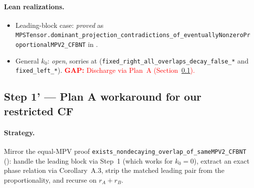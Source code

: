 \documentclass{article}
\newcommand{\leanid}[1]{\texttt{#1}}
\newcommand{\gap}[1]{\textcolor{red}{\textbf{GAP:} #1}}
\theoremstyle{plain}
\begin{document}
\paragraph{Lean realizations.}
\begin{itemize}
    \item Leading-block case: \emph{proved} as
          \leanid{MPSTensor.dominant\_projection\_contradictions\_of\_eventuallyNonzeroProportionalMPV2\_CFBNT}
          in .
    \item General $k_0$: \emph{open}, sorries at
          (\leanid{fixed\_right\_all\_overlaps\_decay\_false\_*} and
          \leanid{fixed\_left\_*}).
          \gap{Discharge via Plan~A (Section~\ref{sec:step1-prime}).}
\end{itemize}

\subsection{Step 1' --- Plan A workaround for our restricted CF}
\label{sec:step1-prime}

\paragraph{Strategy.}
Mirror the equal-MPV proof
\leanid{exists\_nondecaying\_overlap\_of\_sameMPV2\_CFBNT}
(): handle the leading block via
Step~1 (which works for $k_0 = 0$), extract an exact phase relation via
Corollary~A.3, strip the matched leading pair from the proportionality,
and recurse on $r_A + r_B$.
\end{document}
